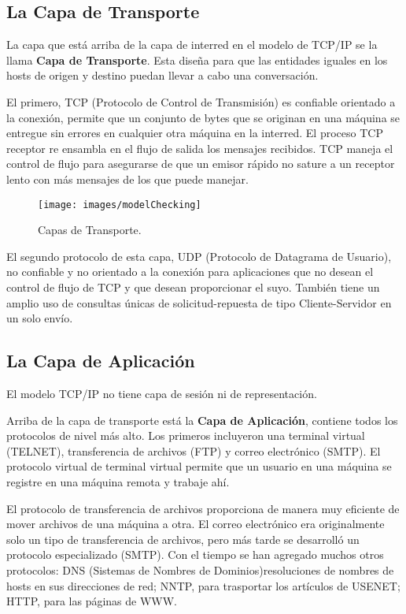 \documentclass[12pt]{report}
\begin{document}
\subsection*{La Capa de Transporte}

La capa que est\'a arriba de la capa de interred en el modelo de TCP/IP se la llama  {\bf Capa de Transporte}. Esta dise\~na para que las entidades iguales en los hosts de origen y destino puedan llevar a cabo una conversaci\'on.

El primero, TCP (Protocolo de Control de Transmisión) es confiable orientado a la conexi\'on, permite que un conjunto de bytes que se originan en una m\'aquina se entregue sin errores en cualquier otra m\'aquina en la interred. El proceso TCP receptor re ensambla en el flujo de salida los mensajes recibidos. TCP maneja el control de flujo para asegurarse de que un emisor r\'apido no sature a un receptor lento con m\'as mensajes de los que puede manejar. 

\begin{figure}[!h]
\texttt{[image: images/modelChecking]}
\caption{Capas de Transporte.}
\label{modelchecking-IO}
\end{figure}

El segundo protocolo de esta capa, UDP (Protocolo de Datagrama de Usuario), no confiable y no orientado a la conexi\'on para aplicaciones que no desean el control de flujo de TCP y que desean proporcionar el suyo. 
Tambi\'en tiene un amplio uso de consultas \'unicas de solicitud-repuesta de tipo Cliente-Servidor en un solo env\'io. 

\subsection*{La Capa de Aplicaci\'on}  
 

El modelo TCP/IP no tiene capa de sesi\'on ni de representaci\'on.
 
Arriba de la capa de transporte est\'a la {\bf Capa de Aplicaci\'on}, contiene todos los protocolos de nivel m\'as alto. Los primeros incluyeron una terminal virtual (TELNET), transferencia de archivos (FTP) y correo electr\'onico (SMTP). El protocolo virtual de terminal virtual permite que un usuario en una m\'aquina se registre en una m\'aquina remota y trabaje ah\'i.
 
El protocolo de transferencia de archivos proporciona de manera muy eficiente de mover archivos de una m\'aquina a otra. El correo electr\'onico era originalmente solo un tipo de transferencia de archivos, pero m\'as tarde se desarroll\'o un protocolo especializado (SMTP). Con el tiempo se han agregado muchos otros protocolos: DNS (Sistemas de Nombres de Dominios)resoluciones de nombres de hosts en sus direcciones de red; NNTP, para trasportar los art\'iculos de USENET; HTTP, para las p\'aginas de WWW. 
\end{document}
